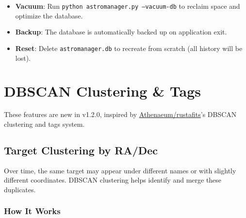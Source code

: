 \documentclass[11pt,a4paper]{article}
\begin{document}
\begin{itemize}
    \item \textbf{Vacuum}: Run \texttt{python astromanager.py --vacuum-db} to reclaim space and optimize the database.
    \item \textbf{Backup}: The database is automatically backed up on application exit.
    \item \textbf{Reset}: Delete \texttt{astromanager.db} to recreate from scratch (all history will be lost).
\end{itemize}


\section{DBSCAN Clustering \& Tags}
\label{sec:clustering}

\begin{newfeaturebox}
These features are new in v1.2.0, inspired by \href{https://github.com/eg013ra1n/rustafits}{Athenaeum/rustafits}'s DBSCAN clustering and tags system.
\end{newfeaturebox}

\subsection{Target Clustering by RA/Dec}

Over time, the same target may appear under different names or with slightly different coordinates. DBSCAN clustering helps identify and merge these duplicates.

\subsubsection{How It Works}
\end{document}
